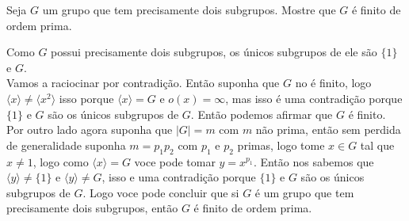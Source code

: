 \begin{homeworkProblem}
  Seja $G$ um grupo que tem precisamente dois subgrupos. Mostre que $G$ é finito de ordem prima.
  \begin{solution}
    Como $G$ possui precisamente dois subgrupos, os únicos subgrupos de ele são $\{1\}$ e $G$.\\
    Vamos a raciocinar por contradição. Então suponha que $G$ no é finito, logo $\langle x\rangle \neq \langle x^{2}\rangle$ isso porque $\langle x\rangle = G$ e $o(x)=\infty$, mas isso é uma contradição porque $\{1\}$ e $G$ são os únicos subgrupos de $G$. Então podemos afirmar que $G$ é finito.
    Por outro lado agora suponha que $|G|=m$ com $m$ não prima, então sem perdida de generalidade suponha $m=p_1p_2$ com $p_1$ e $p_2$ primas, logo tome $x\in G$ tal que $x\neq 1$, logo como $\langle x\rangle = G$ voce pode tomar $y=x^{p_1}$. Então nos sabemos que $\langle y\rangle \neq \{1\}$ e $\langle y\rangle\neq G$, isso e uma contradição porque $\{1\}$ e $G$ são os únicos subgrupos de $G$. Logo voce pode concluir que si $G$ é um grupo que tem precisamente dois subgrupos, então $G$ é finito de ordem prima. 
  \end{solution}
\end{homeworkProblem}
